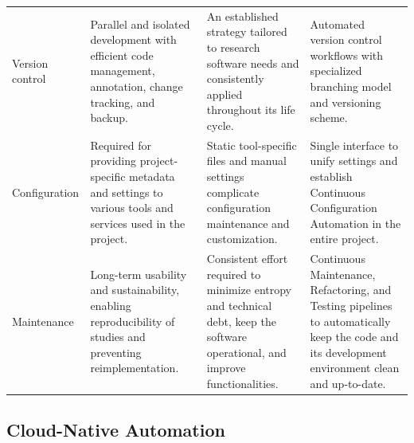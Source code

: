 \documentclass{article}
\begin{document}
\begin{table}[h!]
\begin{tabularx}{\textwidth}{>{\raggedright\arraybackslash}p{2.4cm} >{\raggedright\arraybackslash}X >{\raggedright\arraybackslash}X >{\raggedright\arraybackslash}X}
Version control & Parallel and isolated development with efficient code management, annotation, change tracking, and backup. & An established strategy tailored to research software needs and consistently applied throughout its life cycle. & Automated version control workflows with specialized branching model and versioning scheme.\\

Configuration & Required for providing project-specific metadata and settings to various tools and services used in the project. & Static tool-specific files and manual settings complicate configuration maintenance and customization. & Single interface to unify settings and establish Continuous Configuration Automation in the entire project.\\

Maintenance & Long-term usability and sustainability, enabling reproducibility of studies and preventing reimplementation. & Consistent effort required to minimize entropy and technical debt, keep the software operational, and improve functionalities. & Continuous Maintenance, Refactoring, and Testing pipelines to automatically keep the code and its development environment clean and up-to-date.\\
\bottomrule
\end{tabularx}
\end{table}


\subsection{Cloud-Native Automation}
\end{document}
